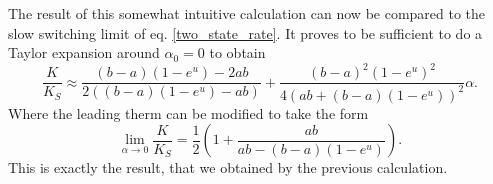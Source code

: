 The result of this somewhat intuitive calculation can now be compared to the slow switching limit of eq. \eqref{two_state_rate}.
It proves to be sufficient to do a Taylor expansion around $\alpha_0 = 0$ to obtain
\begin{equation}
    \frac{K}{K_{S}} \approx \frac{(b-a)(1-e^u)-2ab }{2 \left((b-a) \left(1-e^u\right)-ab\right)} + \frac{  (b-a)^2\left(1-e^u\right)^2}{4 \left(ab + (b-a)(1-e^u)\right)^2} \alpha.
    \label{ksa}
\end{equation}
Where the leading therm can be modified to take the form
\begin{equation}
    \lim_{\alpha \rightarrow 0} \frac{K}{K_{S}} =\frac{1}{2}\left(1+ \frac{ab}{ab-(b-a) \left(1-e^u\right)}\right).
    \label{klim0a}
\end{equation}
This is exactly the result, that we obtained by the previous calculation.
